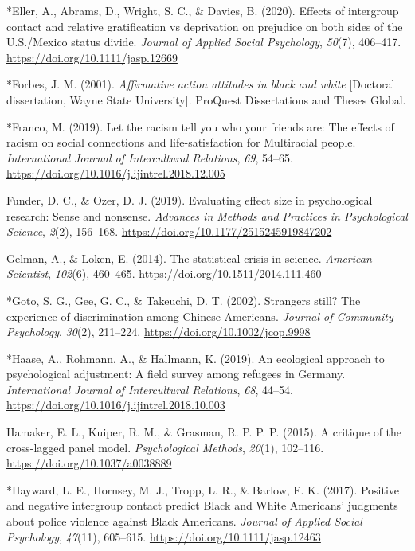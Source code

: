 \documentclass[12pt, letterpaper]{article}
\begin{document}
\leavevmode\hypertarget{ref-4001}{}%
*Eller, A., Abrams, D., Wright, S. C., \& Davies, B. (2020). Effects of
intergroup contact and relative gratification vs deprivation on
prejudice on both sides of the U.S./Mexico status divide. \emph{Journal
of Applied Social Psychology}, \emph{50}(7), 406--417.
\url{https://doi.org/10.1111/jasp.12669}

\leavevmode\hypertarget{ref-1549}{}%
*Forbes, J. M. (2001). \emph{Affirmative action attitudes in black and
white} {[}Doctoral dissertation, Wayne State University{]}. ProQuest
Dissertations and Theses Global.

\leavevmode\hypertarget{ref-325}{}%
*Franco, M. (2019). Let the racism tell you who your friends are: The
effects of racism on social connections and life-satisfaction for
Multiracial people. \emph{International Journal of Intercultural
Relations}, \emph{69}, 54--65.
\url{https://doi.org/10.1016/j.ijintrel.2018.12.005}

\leavevmode\hypertarget{ref-funder_evaluating_2019}{}%
Funder, D. C., \& Ozer, D. J. (2019). Evaluating effect size in
psychological research: Sense and nonsense. \emph{Advances in Methods
and Practices in Psychological Science}, \emph{2}(2), 156--168.
\url{https://doi.org/10.1177/2515245919847202}

\leavevmode\hypertarget{ref-gelman_statistical_2014}{}%
Gelman, A., \& Loken, E. (2014). The statistical crisis in science.
\emph{American Scientist}, \emph{102}(6), 460--465.
\url{https://doi.org/10.1511/2014.111.460}

\leavevmode\hypertarget{ref-1576}{}%
*Goto, S. G., Gee, G. C., \& Takeuchi, D. T. (2002). Strangers still?
The experience of discrimination among Chinese Americans. \emph{Journal
of Community Psychology}, \emph{30}(2), 211--224.
\url{https://doi.org/10.1002/jcop.9998}

\leavevmode\hypertarget{ref-1949}{}%
*Haase, A., Rohmann, A., \& Hallmann, K. (2019). An ecological approach
to psychological adjustment: A field survey among refugees in Germany.
\emph{International Journal of Intercultural Relations}, \emph{68},
44--54. \url{https://doi.org/10.1016/j.ijintrel.2018.10.003}

\leavevmode\hypertarget{ref-hamaker_critique_2015}{}%
Hamaker, E. L., Kuiper, R. M., \& Grasman, R. P. P. P. (2015). A
critique of the cross-lagged panel model. \emph{Psychological Methods},
\emph{20}(1), 102--116. \url{https://doi.org/10.1037/a0038889}

\leavevmode\hypertarget{ref-4003}{}%
*Hayward, L. E., Hornsey, M. J., Tropp, L. R., \& Barlow, F. K. (2017).
Positive and negative intergroup contact predict Black and White
Americans' judgments about police violence against Black Americans.
\emph{Journal of Applied Social Psychology}, \emph{47}(11), 605--615.
\url{https://doi.org/10.1111/jasp.12463}
\end{document}
